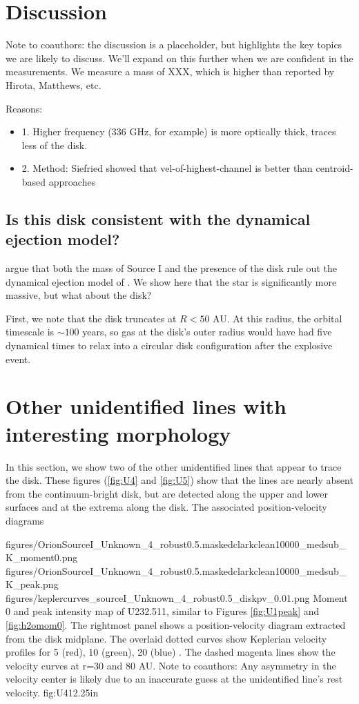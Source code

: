 \documentclass[twocolumn]{aastex61}
\begin{document}
\section{Discussion}
{\color{red} Note to coauthors: the discussion is a placeholder, but highlights
the key topics we are likely to discuss.  We'll expand on this further when
we are confident in the measurements.}
We measure a mass of XXX, which is higher than reported by Hirota, Matthews, etc.

Reasons:
\begin{itemize}
    \item1. Higher frequency (336 GHz, for example) is more optically thick, traces less
of the disk.
\item2. Method: Siefried showed that vel-of-highest-channel is better than centroid-based
approaches
\end{itemize}

\subsection{Is this disk consistent with the dynamical ejection model?}
\citet{Plambeck2016a} argue that both the mass of Source I and the presence of the disk
rule out the dynamical ejection model of \citet{Bally2011a}.  We show here that
the star is significantly more massive, but what about the disk?

First, we note that the disk truncates at $R<50$ AU.  At this radius, the
orbital timescale is $\sim100$ years, so gas at the disk's outer radius would
have had five dynamical times to relax into a circular disk configuration after the
explosive event.



\appendix
\section{Other unidentified lines with interesting morphology}
In this section, we show two of the other unidentified lines that appear to trace
the disk.  These figures (\ref{fig:U4} and \ref{fig:U5}) show that the lines
are nearly absent from the continuum-bright disk, but are detected along the upper and
lower surfaces and at the extrema along the disk.  The associated position-velocity diagrams

\FigureThree
{{figures/OrionSourceI_Unknown_4_robust0.5.maskedclarkclean10000_medsub_K_moment0}.png}
{{figures/OrionSourceI_Unknown_4_robust0.5.maskedclarkclean10000_medsub_K_peak}.png}
{{figures/keplercurves_sourceI_Unknown_4_robust0.5_diskpv_0.01}.png}
{Moment 0 and peak intensity map of U232.511, similar to Figures \ref{fig:U1peak} and \ref{fig:h2omom0}.
The rightmost panel shows a position-velocity diagram extracted from the disk midplane.
The overlaid dotted curves show Keplerian velocity profiles for 5 (red), 10 (green), 20 (blue) \msun.
The dashed magenta lines show the velocity curves at r=30 and 80 AU.
{\color{red} Note to coauthors: Any asymmetry in the velocity center is likely due to an inaccurate
guess at the unidentified line's rest velocity.}
}
{fig:U4}{1}{2.25in}
\end{document}
